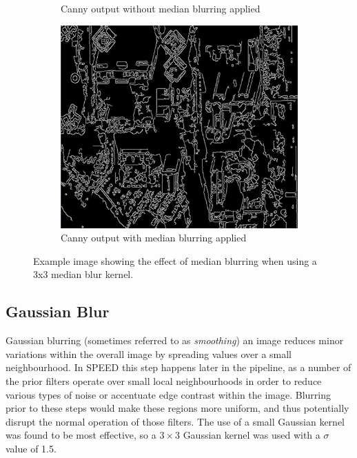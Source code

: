 \documentclass[conference]{IEEEtran}
\begin{document}
\begin{figure}
\begin{subfigure}[b]{0.48\linewidth}
        \caption{Canny output without median blurring applied \label{subfig:no_median_canny}}
    \end{subfigure}
    \begin{subfigure}[b]{0.48\linewidth}
        \centerline{\includegraphics[width=\linewidth]{MedianPre_c.jpg}}
        \caption{Canny output with median blurring applied \label{subfig:median_canny}}
    \end{subfigure}
\caption{Example image showing the effect of median blurring when using a 3x3 median blur kernel.}
\label{fig:median_blur}
\end{figure}

\subsection{Gaussian Blur}
\label{subsec:GB}

Gaussian blurring (sometimes referred to as \emph{smoothing}) an image reduces minor variations within the overall image by spreading values over a small neighbourhood. In SPEED this step happens later in the pipeline, as a number of the prior filters operate over small local neighbourhoods in order to reduce various types of noise or accentuate edge contrast within the image. Blurring prior to these steps would make these regions more uniform, and thus potentially disrupt the normal operation of those filters. The use of a small Gaussian kernel was found to be most effective, so a $3\times3$ Gaussian kernel was used with a $\sigma$ value of 1.5.
\end{document}
